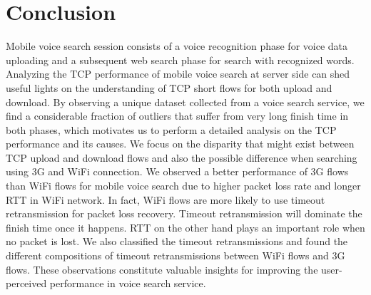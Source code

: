 
\section{Conclusion}
\label{sec:conclude}

Mobile voice search session consists of a voice recognition phase for voice data uploading and a subsequent web search phase for search with recognized words. Analyzing the TCP performance of mobile voice search at server side can shed useful lights on the understanding of TCP short flows for both upload and download. By observing  a unique dataset collected from a voice search service, we find a considerable fraction of outliers that suffer from very long finish time in both phases, which motivates us to perform a detailed analysis on the TCP performance and its causes. We focus on the disparity that might exist between TCP upload and download flows and also the possible difference when searching using 3G and WiFi connection. We observed a better performance of 3G flows than WiFi flows for mobile voice search due to higher packet loss rate and longer RTT in WiFi network. In fact, WiFi flows are more likely to use timeout retransmission for packet loss recovery. Timeout retransmission will dominate the finish time once it happens. RTT on the other hand plays an important role when no packet is lost. We also classified the timeout retransmissions and found the different compositions of timeout retransmissions between WiFi flows and 3G flows. These observations constitute valuable insights for improving the user-perceived performance in voice search service.

